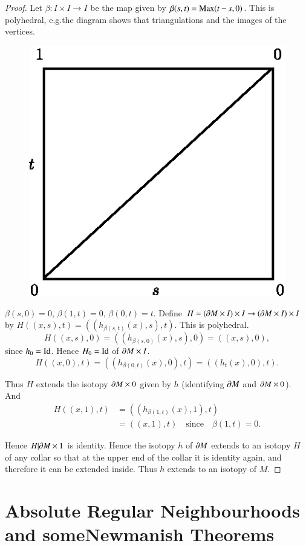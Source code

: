 \begin{proof}
Let $\beta :I\times I\to I$ be the map given by $\beta(s,t)=\operatorname{Max}(t-s,0)$. This is polyhedral, e.g.\@ the diagram shows that triangulations and the images of the vertices.
\begin{figure}[H]
\centering
\includegraphics{figure/fig14.eps}
\end{figure}

$\beta(s,0)=0$, $\beta(1,t)=0$, $\beta(0,t)=t$. Define $H=(\partial M\times I)\times I\to (\partial M\times I)\times I$ by $H((x,s),t)=((h_{\beta(s,t)}(x),s),t)$. This is polyhedral.
$$
H((x,s),0)=((h_{\beta(s,0)}(x),s),0)=((x,s),0),
$$
since $h_{0}=\operatorname{Id}$. Hence $H_{0}=\operatorname{Id}$ of $\partial M\times I$.
$$
H((x,0),t)=((h_{\beta(0,t)}(x),0),t)=((h_{t}(x),0),t).
$$

Thus $H$ extends the isotopy $\partial M\times 0$ given by $h$ (identifying $\partial M$ and $\partial M\times 0$). And\pageoriginale
\begin{align*}
H((x,1),t) &= ((h_{\beta(1,t)}(x),1),t)\\
&= ((x,1),t)\quad\text{since}\quad \beta(1,t)=0.
\end{align*}

Hence $H|\partial M\times 1$ is identity. Hence the isotopy $h$ of $\partial M$ extends to an isotopy $H$ of any collar so that at the upper end of the collar it is identity again, and therefore it can be extended inside. Thus $h$ extends to an isotopy of $M$.
\end{proof}

\section[Absolute Regular Neighbourhoods and some...]{Absolute Regular
  Neighbourhoods and some\hfil\break Newmanish Theorems}\label{chap6-sec6.5} 

